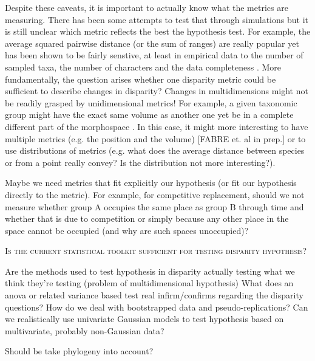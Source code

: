 \documentclass[12pt,letterpaper]{article}
\renewcommand{\section}[1]{%
\bigskip
\begin{center}
\begin{Large}
\normalfont\scshape #1
\medskip
\end{Large}
\end{center}}
\begin{document}
Despite these caveats, it is important to actually know what the metrics are measuring.
There has been some attempts to test that through simulations \citep{Ciampaglio2001,  gerber2017geometry} but it is still unclear which metric reflects the best the hypothesis test.
For example, the average squared pairwise distance (or the sum of ranges) are really popular \citep[e.g.][]{geiger2008} yet has been shown to be fairly senstive, at least in empirical data to the number of sampled taxa, the number of characters and the data completeness \citep[][; although effects were lesser in simulations]{Ciampaglio2001}.
More fundamentally, the question arises whether one disparity metric could be sufficient to describe changes in disparity?
Changes in multidimensions might not be readily grasped by unidimensional metrics!
For example, a given taxonomic group might have the exact same volume as another one yet be in a complete different part of the morphospace \citep[or even overlap or not depending on the dimensions;][]{davis2012acanthodes,brusatte50}.
In this case, it might more interesting to have multiple metrics (e.g. the position and the volume) [FABRE et. al in prep.] or to use distributions of metrics (e.g. what does the average distance between species or from a point really convey? Is the distribution not more interesting?).

Maybe we need metrics that fit explicitly our hypothesis (or fit our hypothesis directly to the metric).
For example, for competitive replacement, should we not measure whether group A occupies the same place as group B through time and whether that is due to competition or simply because any other place in the space cannot be occupied (and why are such spaces unoccupied)?


\section{Is the current statistical toolkit sufficient for testing disparity hypothesis?}
Are the methods used to test hypothesis in disparity actually testing what we think they’re testing (problem of multidimensional hypothesis)
What does an anova or related variance based test real infirm/confirms regarding the disparity questions?
How do we deal with bootstrapped data and pseudo-replications?
Can we realistically use univariate Gaussian models to test hypothesis based on multivariate, probably non-Gaussian data? \citep{blomberg2017beyond}

Should be take phylogeny into account? \citep{polly2013phylogenetic}
\end{document}
